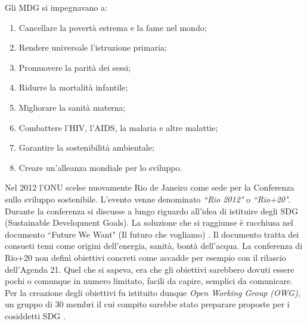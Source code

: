 \noindent Gli MDG si impegnavano a:
\begin{enumerate}
    \item Cancellare la povertà estrema e la fame nel mondo;
    \item Rendere universale l'istruzione primaria;
    \item Promuovere la parità dei sessi;
    \item Ridurre la mortalità infantile;
    \item Migliorare la sanità materna;
    \item Combattere l'HIV, l'AIDS, la malaria e altre malattie;
    \item Garantire la sostenibilità ambientale;
    \item Creare un'alleanza mondiale per lo sviluppo.
\end{enumerate}

\noindent Nel 2012 l'ONU scelse nuovamente Rio de Janeiro come sede per la Conferenza sullo sviluppo sostenibile. L'evento venne denominato \textit{``Rio 2012"} o \textit{``Rio+20"}.
Durante la conferenza si discusse a lungo riguardo all'idea di istituire degli SDG (Sustainable Development Goals).
La soluzione che si raggiunse è racchiusa nel documento ``Future We Want" (Il futuro che vogliamo) \cite{futureWeWant}.\newline
Il documento tratta dei consueti temi  come origini dell'energia, sanità, bontà dell'acqua.
La conferenza di Rio+20 non definì obiettivi concreti come accadde per esempio con il rilascio dell'Agenda 21.\newline
Quel che si sapeva, era che gli obiettivi sarebbero dovuti essere pochi o comunque in numero limitato, facili da capire, semplici da comunicare.
Per la creazione degli obiettivi fu istituito dunque \textit{Open Working Group (OWG)}, un gruppo di 30 membri il cui compito sarebbe stato preparare proposte per i cosiddetti SDG \cite{owg}.
